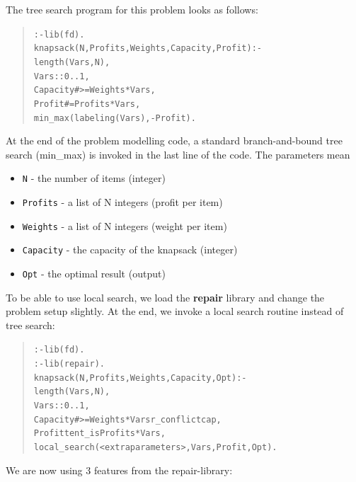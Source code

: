 The tree search program for this problem looks as follows:
\begin{quote}\begin{alltt}
:- lib(fd).
knapsack(N, Profits, Weights, Capacity, Profit) :-
        length(Vars, N),                    %
        Vars :: 0..1,
        Capacity #>= Weights*Vars,          %
        Profit #= Profits*Vars,             %
        min_max(labeling(Vars), -Profit).   %
\end{alltt}\end{quote}
At the end of the problem modelling code, a standard branch-and-bound tree search
(min_max) is invoked in the last line of the code.
The parameters mean
\begin{itemize}
\item {\tt N} - the number of items (integer)
\item {\tt Profits} - a list of N integers (profit per item)
\item {\tt Weights} - a list of N integers (weight per item)
\item {\tt Capacity} - the capacity of the knapsack (integer)
\item {\tt Opt} - the optimal result (output)
\end{itemize}
To be able to use local search, we load the {\bf repair} library and
change the problem setup slightly.
At the end, we invoke a local search routine instead of tree search:
\begin{quote}\begin{alltt}
:- lib(fd).
:- lib(repair).
knapsack(N, Profits, Weights, Capacity, Opt) :-
        length(Vars, N),
        Vars :: 0..1,
        Capacity #>= Weights*Vars  r_conflict cap,
        Profit tent_is Profits*Vars,
        local_search(<extra parameters>, Vars, Profit, Opt).
\end{alltt}\end{quote}
We are now using 3 features from the repair-library:

